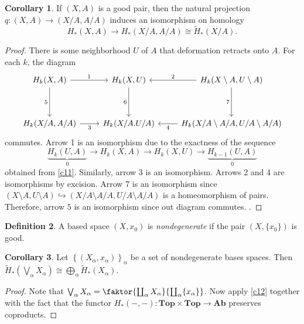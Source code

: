 \documentclass[10pt,letterpaper,cm]{nupset}
\theoremstyle{definition}
\newtheorem{definition}{Definition}[subsection]
\theoremstyle{theorem}
\newtheorem{corollary}[definition]{Corollary}
\theoremstyle{remark}
\newcommand{\1}{\mathbb{1}}
\newcommand{\0}{\vec 0}
\begin{document}
\begin{corollary}
If $(X,A)$ is a good pair, then the natural projection $q: \left(X, A\right) \to \left(X/A, A/A\right)$ induces an isomorphism on homology $$ H_{\ast}(X,A) \to H_{\ast}(X/A, A/A) \cong \widetilde{H}_{\ast}(X/A)  .$$
\end{corollary}
\begin{proof}
There is some neighborhood $U$ of $A$ that deformation retracts onto $A$. For each $k$, the diagram 
\[
\begin{tikzcd}
{H_k(X,A)} \arrow[dd, "5"'] \arrow[r, "1"] & {H_k(X,U)} \arrow[dd, "6"'] & {H_k(X\setminus A, U \setminus A)} \arrow[l, "2"'] \arrow[dd, "7"'] \\
                                           &                             &                                                                     \\
{H_k(X/A, A/A)} \arrow[r, "3"']            & H_k(X/A. U/A)               & {H_k(X/A \setminus A/A, U/A \setminus A/A)} \arrow[l, "4"]         
\end{tikzcd}
\] commutes. Arrow 1 is an isomorphism due to the exactness of the sequence $$\underbrace{H_k(U, A)}_{0} \to H_k(X,A) \to H_k(X,U) \to \underbrace{H_{k-1}(U,A)}_{0}$$ obtained from \cref{c11}. Similarly, arrow 3 is an isomorphism. Arrows 2 and 4 are isomorphisms by excision. Arrow 7 is an isomorphism since $(X\setminus A , U \setminus A) \hookrightarrow (X/A \setminus A/A, U/A \setminus A/A)$ is a homeomorphism of pairs. Therefore, arrow $5$ is an isomorphism since out diagram commutes. . 
\end{proof}

\begin{definition}
A based space $(X,x_0)$ is \textit{nondegenerate} if the pair $\left(X, \{x_0\}\right)$ is good. 
\end{definition}

\begin{corollary}
Let $\left\{(X_{\alpha}, x_{\alpha})\right\}_{\alpha}$ be a set of nondegenerate bases spaces. Then $\widetilde{H}_{\ast}\left(\bigvee_{\alpha} X_{\alpha}\right) \cong \bigoplus_{\alpha} \widetilde{H}_{\ast}(X_{\alpha}).$
\end{corollary}
\begin{proof}
Note that $\bigvee_{\alpha} X_{\alpha} = \faktor{\coprod_{\alpha}X_{\alpha}}{\coprod_{\alpha} \{x_{\alpha}\}}$. Now apply \cref{c12} together with the fact that the functor $H_{\ast}({-}, {-}): \mathbf{Top}\times \mathbf{Top} \to \mathbf{Ab}$ preserves coproducts. 
\end{proof}
\end{document}
